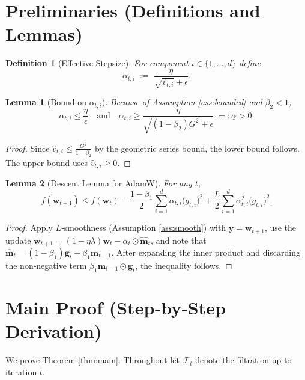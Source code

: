 \documentclass[11pt]{article}
\newtheorem{lemma}{Lemma}
\newtheorem{definition}{Definition}
\begin{document}
\section*{Preliminaries (Definitions and Lemmas)}
\begin{definition}[Effective Stepsize]
For component $i\in\{1,\dots,d\}$ define
\[
\alpha_{t,i}\;:=\;\frac{\eta}{\sqrt{\hat{v}_{t,i}}+\epsilon}.
\]
\end{definition}
\begin{lemma}[Bound on $\alpha_{t,i}$]
\label{lem:alpha}
Because of Assumption \ref{ass:bounded} and $\beta_2<1$,
\[
\alpha_{t,i}\le \frac{\eta}{\epsilon}\quad\text{and}\quad
\alpha_{t,i}\ge \frac{\eta}{\sqrt{(1-\beta_2)G^{2}}+\epsilon}\;=: \underline{\alpha}>0.
\]
\end{lemma}
\begin{proof}
Since $\hat{v}_{t,i}\le \frac{G^{2}}{1-\beta_2}$ by the geometric series bound,
the lower bound follows. The upper bound uses $\hat{v}_{t,i}\ge 0$.
\end{proof}
\begin{lemma}[Descent Lemma for AdamW]
\label{lem:descent}
For any $t$,
\[
f(\bm{w}_{t+1})\le f(\bm{w}_t)-\frac{1-\beta_1}{2}\sum_{i=1}^{d}\alpha_{t,i} \bigl(g_{t,i}\bigr)^{2}
   +\frac{L}{2}\sum_{i=1}^{d}\alpha_{t,i}^{2}\bigl(g_{t,i}\bigr)^{2}.
\]
\end{lemma}
\begin{proof}
Apply $L$‑smoothness (Assumption \ref{ass:smooth}) with $\bm{y}=\bm{w}_{t+1}$,
use the update $\bm{w}_{t+1}=(1-\eta\lambda)\bm{w}_t-\alpha_t\odot\hat{\bm m}_t$,
and note that $\hat{\bm m}_t=(1-\beta_1)\bm{g}_t+ \beta_1\bm{m}_{t-1}$.
After expanding the inner product and discarding the non‑negative term
$\beta_1\bm{m}_{t-1}\odot\bm{g}_t$, the inequality follows.
\end{proof}

\section*{Main Proof (Step‑by‑Step Derivation)}
We prove Theorem \ref{thm:main}.  Throughout let $\mathcal{F}_t$ denote the filtration up to iteration $t$.
\end{document}

